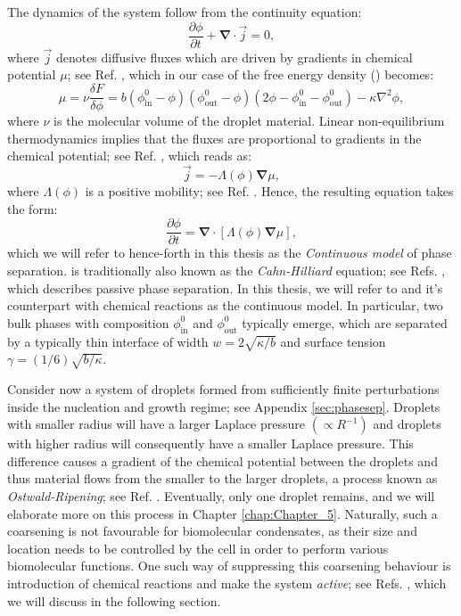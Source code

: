 The dynamics of the system follow from the continuity equation:
\begin{equation*}
    \frac{\partial \phi}{\partial t} + {\boldsymbol{\nabla}} \cdot \vec{j} = 0,
\end{equation*} 
where $\vec{j}$ denotes diffusive fluxes which are driven by gradients in chemical potential $\mu$; see Ref. \cite{Review2019}, which in our case of the free energy density () becomes:
\begin{equation}
\label{eqn:chemical_potential}
    \mu = \nu \frac{\delta F}{\delta \phi} = b (\phi^{0}_\mathrm{in} - \phi) (\phi^{0}_\mathrm{out} - \phi) (2\phi - \phi^{0}_\mathrm{in} - \phi^{0}_\mathrm{out}) - \kappa \nabla^2 \phi,
\end{equation}
where $\nu$ is the molecular volume of the droplet material.
Linear non-equilibrium thermodynamics implies that the fluxes are proportional to gradients in the chemical potential; see Ref. \cite{Review2019}, which reads as:
\begin{equation*}
    \vec{j} = -\Lambda(\phi) {\boldsymbol{\nabla}}\mu,
\end{equation*}
where $\Lambda(\phi)$ is a positive mobility; see Ref. \cite{GrootBook}.
Hence, the resulting equation takes the form:
\begin{equation} \label{eqn:CHPassive}
    \frac{\partial \phi}{\partial t} = {\boldsymbol{\nabla}} \cdot [\Lambda(\phi) {\boldsymbol{\nabla}} \mu],
\end{equation}
which we will refer to hence-forth in this thesis as the \textit{Continuous model} of phase separation.
 is traditionally also known as the \textit{Cahn-Hilliard} equation; see Refs. \cite{Cahn1958,CahnHilliardEq}, which describes passive phase separation.
In this thesis, we will refer to  and it's counterpart with chemical reactions  as the continuous model. 
In particular, two bulk phases with composition $\phi^{0}_\mathrm{in}$ and $\phi^{0}_\mathrm{out}$ typically emerge, which are separated by a typically thin interface of width $w = 2 \sqrt{\kappa/b}$ and surface tension $\gamma = (1/6) \sqrt{b/ \kappa}$.

Consider now a system of droplets formed from sufficiently finite perturbations inside the nucleation and growth regime; see Appendix \ref{sec:phasesep}.
Droplets with smaller radius will have a larger Laplace pressure $(\propto R^{-1})$ and droplets with higher radius will consequently have a smaller Laplace pressure. 
This difference causes a gradient of the chemical potential between the droplets and thus material flows from the smaller to the larger droplets, a process known as \textit{Ostwald-Ripening}; see Ref. \cite{Review2019}.
Eventually, only one droplet remains, and we will elaborate more on this process in Chapter \ref{chap:Chapter_5}.
Naturally, such a coarsening is not favourable for biomolecular condensates, as their size and location needs to be controlled by the cell in order to perform various biomolecular functions.
One such way of suppressing this coarsening behaviour is introduction of chemical reactions and make the system \textit{active}; see Refs. \cite{Zwicker2015,Review2019,Glotzer1995}, which we will discuss in the following section.

